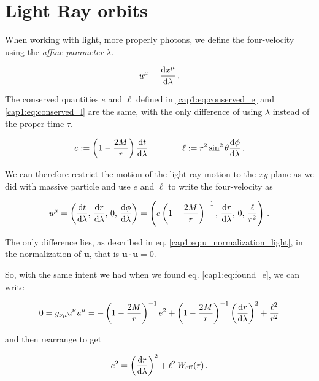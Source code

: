
\newpage


\section{Light Ray orbits}

When working with light, more properly photons, we define the four-velocity
using the \textit{affine parameter} $\lambda$.

\begin{equation*}
    u^\mu = \dv{x^\mu}{\lambda} \, .
\end{equation*}

The conserved quantities $e$ and $\ell$ defined in \ref{cap1:eq:conserved_e} and
\ref{cap1:eq:conserved_l} are the same, with the only difference of using
$\lambda$ instead of the proper time $\tau$.

\begin{equation*}
    e := \left( 1 - \frac{2M}{r} \right) \dv{t}{\lambda} 
    \quad \quad \quad \quad
    \ell := r^2 \sin^2 \theta \dv{\phi}{\lambda} \, .
\end{equation*}

We can therefore restrict the motion of the light ray motion to the $xy$ plane
as we did with massive particle and use $e$ and $\ell$ to write the
four-velocity as

\begin{equation*}
    u^\mu
    = \left(\dv{t}{\lambda}, \, \dv{r}{\lambda}, \,
    0, \, \dv{\phi}{\lambda} \right)
    = \left( e \left(1 - \frac{2M}{r} \right)^{-1}, \, \dv{r}{\lambda}, \,
    0, \, \frac{\ell}{r^2} \right) \, .
\end{equation*}

The only difference lies, as described in eq.
\ref{cap1:eq:u_normalization_light}, in the normalization of $\mathbf u$, that
is $\mathbf{u \cdot u} = 0$.

So, with the same intent we had when we found eq. \ref{cap1:eq:found_e}, we can
write

\begin{equation*}
    0 = g_{\nu \mu} u^\nu u^\mu =
    - \left(1 - \frac{2M}{r} \right)^{-1} e^2
    + \left(1 - \frac{2M}{r} \right)^{- 1} \left(\dv{r}{\lambda} \right)^2
    + \frac{\ell^2}{r^2}
\end{equation*}

and then rearrange to get

\begin{equation}
    e^2 = \left( \dv{r}{\lambda} \right)^2 + \ell^2 \, W_{\rm eff} (r) \, .
    \label{cap1:eq:found_e_massless}
\end{equation}


